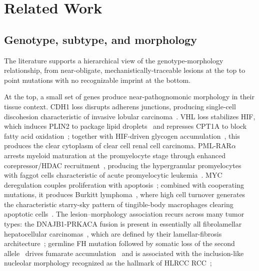 \section{Related Work}\label{sec:related}

\subsection{Genotype, subtype, and morphology}\label{sec:related/morphology}

The literature supports a hierarchical view of the genotype-morphology relationship, from near-obligate, mechanistically-traceable lesions at the top to point mutations with no recognizable imprint at the bottom.

At the top, a small set of genes produce near-pathognomonic morphology in their tissue context.
CDH1 loss disrupts adherens junctions, producing single-cell discohesion characteristic of invasive lobular carcinoma~\cite{frixenEcadherinmediatedCellcellAdhesion1991, derksenSomaticInactivationEcadherin2006}.
VHL loss stabilizes HIF, which induces PLIN2 to package lipid droplets~\cite{qiuHIF2aDependentLipidStorage2015} and represses CPT1A to block fatty acid oxidation~\cite{duHIFDrivesLipid2017}; together with HIF-driven glycogen accumulation~\cite{chenGYS1InducesGlycogen2020, pescadorHypoxiaPromotesGlycogen2010}, this produces the clear cytoplasm of clear cell renal cell carcinoma.
PML-RAR$\alpha$ arrests myeloid maturation at the promyelocyte stage through enhanced corepressor/HDAC recruitment~\cite{grignaniFusionProteinsRetinoic1998, linRoleHistoneDeacetylase1998}, producing the hypergranular promyelocytes with faggot cells characteristic of acute promyelocytic leukemia~\cite{swerdlowWHOClassificationTumours, sehgalAuerRodsFaggot2023}.
MYC deregulation couples proliferation with apoptosis~\cite{evanInductionApoptosisFibroblasts1992, eischenDisruptionARFMdm21999}; combined with cooperating mutations, it produces Burkitt lymphoma~\cite{schmitzBurkittLymphomaPathogenesis2012}, where high cell turnover generates the characteristic starry-sky pattern of tingible-body macrophages clearing apoptotic cells~\cite{swerdlowWHOClassificationTumours, dy-ledesmaStarrySkyPattern2016}.
The lesion–morphology association recurs across many tumor types:
the DNAJB1-PRKACA fusion is present in essentially all fibrolamellar hepatocellular carcinomas~\cite{honeymanDetectionRecurrentDNAJB1PRKACA2014}, which are defined by their lamellar-fibrosis architecture~\cite{craigFibrolamellarCarcinomaLiver1980}; 
germline FH mutation followed by somatic loss of the second allele~\cite{tomlinsonGermlineMutationsFH2002} drives fumarate accumulation~\cite{pollardAccumulationKrebsCycle2005, adamRenalCystFormation2011} and is associated with the inclusion-like nucleolar morphology recognized as the hallmark of HLRCC RCC~\cite{merinoMorphologicSpectrumKidney2007}; 
